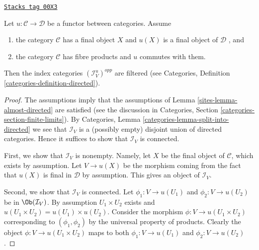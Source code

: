 \begin{lemma}[Directed]
\label{sites-lemma-directed}
\href{https://stacks.math.columbia.edu/tag/00X3}{\texttt{Stacks tag 00X3}}

Let $u : \mathcal{C} \to \mathcal{D}$ be a functor between categories.
Assume
\begin{enumerate}
\item the category $\mathcal{C}$ has a final object $X$ and
$u(X)$ is a final object of $\mathcal{D}$ , and
\item the category $\mathcal{C}$ has fibre products and
$u$ commutes with them.
\end{enumerate}
Then the index categories $(\mathcal{I}^u_V)^{opp}$ are filtered (see
Categories, Definition \ref{categories-definition-directed}).
\end{lemma}

\begin{proof}

The assumptions imply that the assumptions of
Lemma \ref{sites-lemma-almost-directed}
are satisfied (see the discussion in
Categories, Section \ref{categories-section-finite-limits}).
By
Categories, Lemma \ref{categories-lemma-split-into-directed}
we see that $\mathcal{I}_V$ is a (possibly empty) disjoint union of
directed categories.
Hence it suffices to show that $\mathcal{I}_V$ is connected.

\medskip\noindent
First, we show that $\mathcal{I}_V$ is nonempty.
Namely, let $X$ be the final object of $\mathcal{C}$,
which exists by assumption.
Let $V \to u(X)$ be the morphism coming from the fact
that $u(X)$ is final in $\mathcal{D}$ by assumption.
This gives an object of $\mathcal{I}_V$.

\medskip\noindent
Second, we show that $\mathcal{I}_V$ is connected.
Let $\phi_1 : V \to u(U_1)$ and $\phi_2 : V \to u(U_2)$ be
in $\Ob(\mathcal{I}_V)$. By assumption $U_1\times U_2$
exists and $u(U_1\times U_2) = u(U_1)\times u(U_2)$.
Consider the morphism $\phi : V \to u(U_1\times U_2)$
corresponding to $(\phi_1, \phi_2)$ by the universal property
of products. Clearly the object $\phi : V \to u(U_1\times U_2)$
maps to both $\phi_1 : V \to u(U_1)$ and $\phi_2 : V \to u(U_2)$.
\end{proof}

